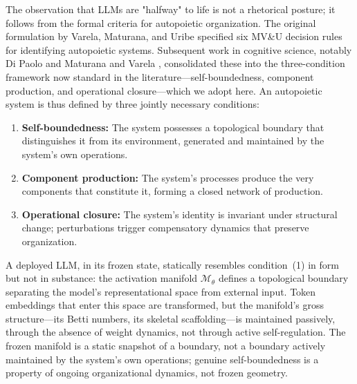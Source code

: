 \documentclass{article}
\begin{document}
The observation that LLMs are "halfway" to life is not a rhetorical posture; it follows from the formal criteria for autopoietic organization. The original formulation by Varela, Maturana, and Uribe \citep{Varela1974autopoiesis} specified six MV\&U decision rules for identifying autopoietic systems. Subsequent work in cognitive science, notably Di Paolo \citep{DiPaolo2005} and Maturana and Varela \citep{Maturana1980autopoiesis}, consolidated these into the three-condition framework now standard in the literature---self-boundedness, component production, and operational closure---which we adopt here. An autopoietic system is thus defined by three jointly necessary conditions:

\begin{enumerate}
    \item \textbf{Self-boundedness:} The system possesses a topological boundary that distinguishes it from its environment, generated and maintained by the system's own operations.
    \item \textbf{Component production:} The system's processes produce the very components that constitute it, forming a closed network of production.
    \item \textbf{Operational closure:} The system's identity is invariant under structural change; perturbations trigger compensatory dynamics that preserve organization.
\end{enumerate}

A deployed LLM, in its frozen state, statically resembles condition~(1) in form but not in substance: the activation manifold $\mathcal{M}_\theta$ defines a topological boundary separating the model's representational space from external input. Token embeddings that enter this space are transformed, but the manifold's gross structure---its Betti numbers, its skeletal scaffolding---is maintained passively, through the absence of weight dynamics, not through active self-regulation. The frozen manifold is a static snapshot of a boundary, not a boundary actively maintained by the system's own operations; genuine self-boundedness is a property of ongoing organizational dynamics, not frozen geometry.
\end{document}
